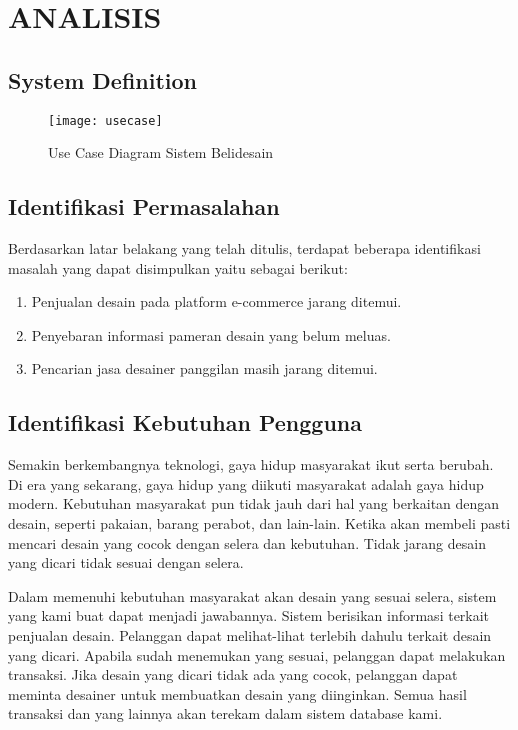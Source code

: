 \chapter{ANALISIS}
\section{System Definition}
\begin{figure}[h]
	\centering
	\texttt{[image: usecase]}
	\caption{Use Case Diagram Sistem Belidesain}
\end{figure}

\section{Identifikasi Permasalahan}
Berdasarkan latar belakang yang telah ditulis, terdapat beberapa identifikasi masalah yang dapat disimpulkan yaitu sebagai berikut:
\begin{enumerate}
	\item Penjualan desain pada platform e-commerce jarang ditemui.
	\item Penyebaran informasi pameran desain yang belum meluas.
	\item Pencarian jasa desainer panggilan masih jarang ditemui.
\end{enumerate}

\section{Identifikasi Kebutuhan Pengguna}
Semakin berkembangnya teknologi, gaya hidup masyarakat ikut serta berubah. Di era yang sekarang, gaya hidup yang diikuti masyarakat adalah gaya hidup modern. Kebutuhan masyarakat pun tidak jauh dari hal yang berkaitan dengan desain, seperti pakaian, barang perabot, dan lain-lain. Ketika akan membeli pasti mencari desain yang cocok dengan selera dan kebutuhan. Tidak jarang desain yang dicari tidak sesuai dengan selera.
\par Dalam memenuhi kebutuhan masyarakat akan desain yang sesuai selera, sistem yang kami buat dapat menjadi jawabannya. Sistem berisikan informasi terkait penjualan desain. Pelanggan dapat melihat-lihat terlebih dahulu terkait desain yang dicari. Apabila sudah menemukan yang sesuai, pelanggan dapat melakukan transaksi. Jika desain yang dicari tidak ada yang cocok, pelanggan dapat meminta desainer untuk membuatkan desain yang diinginkan. Semua hasil transaksi dan yang lainnya akan terekam dalam sistem database kami. 
